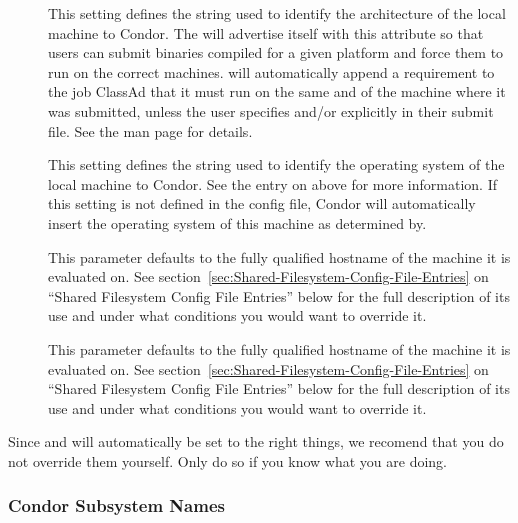 \begin{description}

\item[] \label{param:Arch} This setting defines the string
  used to identify the architecture of the local machine to Condor.
  The  will advertise itself with this attribute so
  that users can submit binaries compiled for a given platform and
  force them to run on the correct machines.   will
  automatically append a requirement to the job ClassAd that it must
  run on the same  and  of the machine where
  it was submitted, unless the user specifies  and/or
   explicitly in their submit file.  See the
   man page for details.  

\item[] \label{param:OpSys} This setting defines the
  string used to identify the operating system of the local machine to
  Condor.  See the entry on  above for more information.
  If this setting is not defined in the config file, Condor will
  automatically insert the operating system of this machine as
  determined by.  

\item[] This parameter defaults to the fully
  qualified hostname of the machine it is evaluated on.  See
  section~\ref{sec:Shared-Filesystem-Config-File-Entries} on ``Shared
  Filesystem Config File Entries'' below for the full description of
  its use and under what conditions you would want to override it.

\item[] This parameter defaults to the fully
  qualified hostname of the machine it is evaluated on.  See
  section~\ref{sec:Shared-Filesystem-Config-File-Entries} on ``Shared
  Filesystem Config File Entries'' below for the full description of
  its use and under what conditions you would want to override it.

\end{description}

Since  and  will automatically be set to the
right things, we recomend that you do not override them yourself.
Only do so if you know what you are doing.
  
\subsubsection{Condor Subsystem Names}
\label{sec:Condor-Subsystem-Names}

